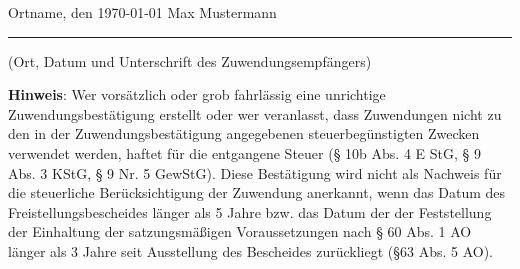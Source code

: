 \documentclass[12pt,ngerman]{scrartcl}
\begin{document}
\vspace*{2.25em}
{\footnotesize Ortname, den \today \hspace*{20em} Max Mustermann}

\hrule

\vspace*{0.5em} (Ort, Datum und Unterschrift des Zuwendungsempfängers) 

{\singlespacing \scriptsize \textbf{Hinweis}: \newline
Wer vorsätzlich oder grob fahrlässig eine unrichtige Zuwendungsbestätigung erstellt oder wer veranlasst, dass Zuwendungen nicht
zu den in der Zuwendungsbestätigung angegebenen steuerbegünstigten Zwecken verwendet werden, haftet für die entgangene Steuer (§ 10b Abs. 4 E StG, § 9 Abs. 3 KStG, § 9 Nr. 5 GewStG). \newline
Diese Bestätigung wird nicht als Nachweis für die steuerliche Berücksichtigung der Zuwendung anerkannt, wenn das Datum des Freistellungsbescheides länger als 5 Jahre bzw. das Datum der der Feststellung der Einhaltung der satzungsmäßigen Voraussetzungen nach § 60 Abs. 1 AO länger als 3 Jahre seit Ausstellung des Bescheides zurückliegt (§63 Abs. 5 AO). }
\end{document}
